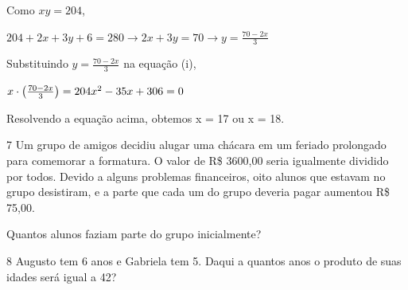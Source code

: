 \begin{escolha}
\begin{boxmedio}
\begin{boxmedio}
{\begin{boxpeq}
\begin{boxpeq}
{\begin{boxpeq}
\begin{boxmedio}
\begin{boxmedio}
\begin{boxpeq}
\begin{boxmedio}
\begin{boxpeq}
\begin{boxpeq}
\begin{boxpeq}
\begin{boxpeq}
\begin{boxmedio}
{\begin{boxmedio}
\begin{boxmedio}
\begin{boxpeq}
\begin{boxmedio}
\begin{boxpeq}
\begin{boxpeq}
\begin{boxpeq}
\begin{escolha}
{\begin{boxmedio}
\begin{boxpeq}
\begin{boxpeq}
\begin{boxpeq}
\begin{boxpeq}
\begin{boxpeq}
\begin{boxmedio}
\begin{boxpeq}
{Como $xy =204$,

$204 + 2x + 3y + 6 = 280 \rightarrow
2x + 3y = 70 \rightarrow
y = \frac{70-2x}{3}$

Substituindo $y = \frac{70-2x}{3}$ na equação (i),

$x \cdot \left ( \frac{70-2x}{3} \right ) = 204

x\textsuperscript{2} - 35x + 306 = 0$

Resolvendo a equação acima, obtemos x = 17 ou x = 18.}

\num{7} Um grupo de amigos decidiu alugar uma chácara em um feriado
prolongado para comemorar a formatura. O valor de R\$ 3600,00 seria igualmente
dividido por todos. Devido a alguns problemas financeiros, oito alunos
que estavam no grupo desistiram, e a parte que cada um do grupo deveria
pagar aumentou R\$ 75,00.

Quantos alunos faziam parte do grupo inicialmente?



\num{8} Augusto tem 6 anos e Gabriela tem 5. Daqui a quantos anos o produto
de suas idades será igual a 42?


\end{boxpeq}
\end{boxmedio}
\end{boxpeq}
\end{boxpeq}
\end{boxpeq}
\end{boxpeq}
\end{boxpeq}
\end{boxmedio}}
\end{escolha}
\end{boxpeq}
\end{boxpeq}
\end{boxpeq}
\end{boxmedio}
\end{boxpeq}
\end{boxmedio}
\end{boxmedio}}
\end{boxmedio}
\end{boxpeq}
\end{boxpeq}
\end{boxpeq}
\end{boxpeq}
\end{boxmedio}
\end{boxpeq}
\end{boxmedio}
\end{boxmedio}
\end{boxpeq}}
\end{boxpeq}
\end{boxpeq}}
\end{boxmedio}
\end{boxmedio}
\end{escolha}
